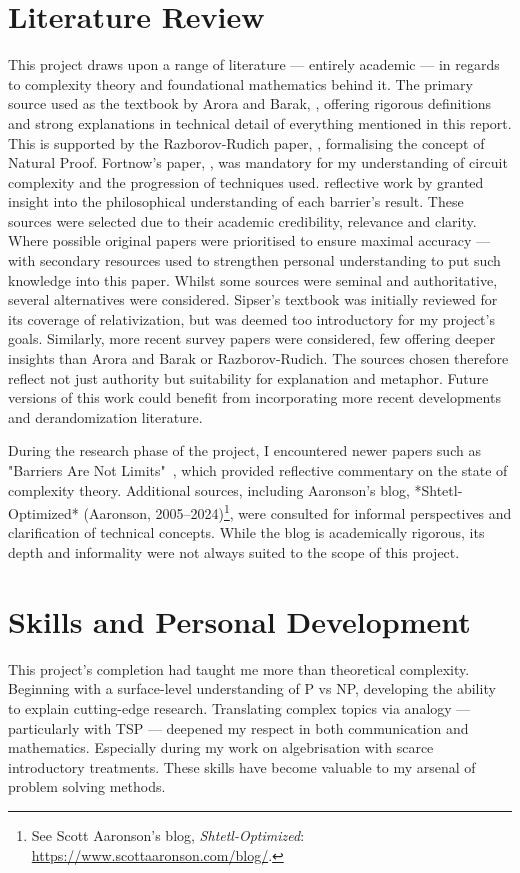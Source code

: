 \documentclass[12pt]{report}
\begin{document}
\section*{Literature Review}
This project draws upon a range of literature --- entirely academic --- in regards to complexity theory and foundational mathematics behind it.
The primary source used as the textbook by Arora and Barak, \cite{arora2009}, offering rigorous definitions and strong explanations in technical detail of everything mentioned in this report.
This is supported by the Razborov-Rudich paper, \cite{razborov1994}, formalising the concept of Natural Proof.
Fortnow's paper, \cite{fortnow2009status}, was mandatory for my understanding of circuit complexity and the progression of techniques used.
reflective work by \cite{aaronson2005philosophers} granted insight into the philosophical understanding of each barrier's result.
These sources were selected due to their academic credibility, relevance and clarity.
Where possible original papers were prioritised to ensure maximal accuracy ---  with secondary resources used to strengthen personal understanding to put such knowledge into this paper.
Whilst some sources were seminal and authoritative, several alternatives were considered.
Sipser's textbook was initially reviewed for its coverage of relativization, but was deemed too introductory for my project's goals.
Similarly, more recent survey papers were considered, few offering deeper insights than Arora and Barak or Razborov-Rudich.
The sources chosen therefore reflect not just authority but suitability for explanation and metaphor.
Future versions of this work could benefit from incorporating more recent developments and derandomization literature.

During the research phase of the project, I encountered newer papers such as "Barriers Are Not Limits"~\citep{williams2022barriers}, which provided reflective commentary on the state of complexity theory.  
Additional sources, including Aaronson's blog, *Shtetl-Optimized* (Aaronson, 2005–2024)\footnote{See Scott Aaronson's blog, \textit{Shtetl-Optimized}: \url{https://www.scottaaronson.com/blog/}.}, were consulted for informal perspectives and clarification of technical concepts.  
While the blog is academically rigorous, its depth and informality were not always suited to the scope of this project.

\section*{Skills and Personal Development}
This project's completion had taught me more than theoretical complexity.
Beginning with a surface-level understanding of P vs NP, developing the ability to explain cutting-edge research.
Translating complex topics via analogy --- particularly with TSP --- deepened my respect in both communication and mathematics.
Especially during my work on algebrisation with scarce introductory treatments.
These skills have become valuable to my arsenal of problem solving methods.
\end{document}
